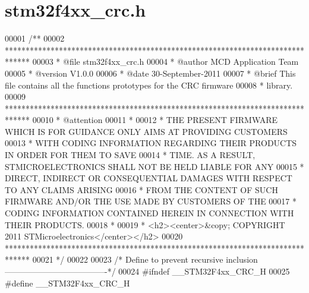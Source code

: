 \section{stm32f4xx\+\_\+crc.\+h}
\label{stm32f4xx__crc_8h_source}

\begin{DoxyCode}
00001 \textcolor{comment}{/**}
00002 \textcolor{comment}{  ******************************************************************************}
00003 \textcolor{comment}{  * @file    stm32f4xx\_crc.h}
00004 \textcolor{comment}{  * @author  MCD Application Team}
00005 \textcolor{comment}{  * @version V1.0.0}
00006 \textcolor{comment}{  * @date    30-September-2011}
00007 \textcolor{comment}{  * @brief   This file contains all the functions prototypes for the CRC firmware }
00008 \textcolor{comment}{  *          library.}
00009 \textcolor{comment}{  ******************************************************************************}
00010 \textcolor{comment}{  * @attention}
00011 \textcolor{comment}{  *}
00012 \textcolor{comment}{  * THE PRESENT FIRMWARE WHICH IS FOR GUIDANCE ONLY AIMS AT PROVIDING CUSTOMERS}
00013 \textcolor{comment}{  * WITH CODING INFORMATION REGARDING THEIR PRODUCTS IN ORDER FOR THEM TO SAVE}
00014 \textcolor{comment}{  * TIME. AS A RESULT, STMICROELECTRONICS SHALL NOT BE HELD LIABLE FOR ANY}
00015 \textcolor{comment}{  * DIRECT, INDIRECT OR CONSEQUENTIAL DAMAGES WITH RESPECT TO ANY CLAIMS ARISING}
00016 \textcolor{comment}{  * FROM THE CONTENT OF SUCH FIRMWARE AND/OR THE USE MADE BY CUSTOMERS OF THE}
00017 \textcolor{comment}{  * CODING INFORMATION CONTAINED HEREIN IN CONNECTION WITH THEIR PRODUCTS.}
00018 \textcolor{comment}{  *}
00019 \textcolor{comment}{  * <h2><center>&copy; COPYRIGHT 2011 STMicroelectronics</center></h2>}
00020 \textcolor{comment}{  ******************************************************************************}
00021 \textcolor{comment}{  */}
00022 
00023 \textcolor{comment}{/* Define to prevent recursive inclusion -------------------------------------*/}
00024 \textcolor{preprocessor}{#}\textcolor{preprocessor}{ifndef} \textcolor{preprocessor}{\_\_STM32F4xx\_CRC\_H}
00025 \textcolor{preprocessor}{#}\textcolor{preprocessor}{define} \textcolor{preprocessor}{\_\_STM32F4xx\_CRC\_H}

\end{DoxyCode}
